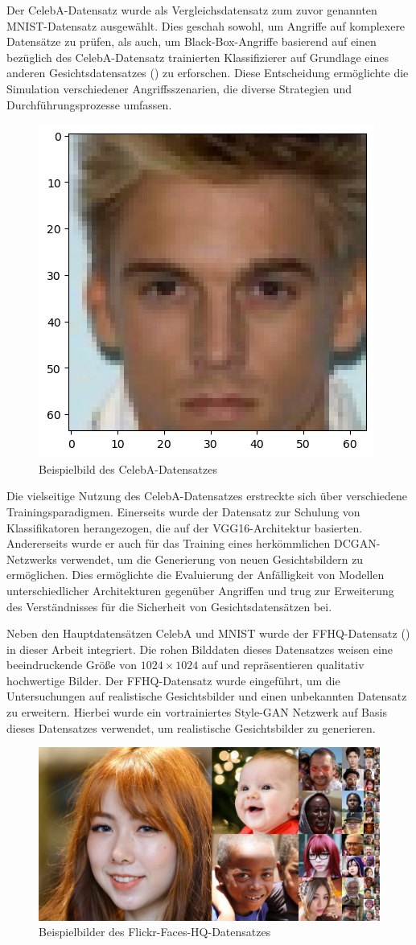 Der CelebA-Datensatz wurde als Vergleichsdatensatz zum zuvor genannten MNIST-Datensatz ausgewählt. Dies geschah sowohl, um Angriffe auf komplexere Datensätze zu prüfen, als auch, um Black-Box-Angriffe basierend auf einen bezüglich des CelebA-Datensatz trainierten Klassifizierer auf Grundlage eines anderen Gesichtsdatensatzes (\cite{noauthor_nvlabsffhq-dataset_2023}) zu erforschen. Diese Entscheidung ermöglichte die Simulation verschiedener Angriffsszenarien, die diverse Strategien und Durchführungsprozesse umfassen.

\begin{figure}[H]
	\centering
	\includegraphics[width=0.3\linewidth]{Bilder/0_celeba_one.png}
	\caption{Beispielbild des CelebA-Datensatzes}
	\label{img:celeba}
\end{figure}

Die vielseitige Nutzung des CelebA-Datensatzes erstreckte sich über verschiedene Trainingsparadigmen. Einerseits wurde der Datensatz zur Schulung von Klassifikatoren herangezogen, die auf der VGG16-Architektur basierten. Andererseits wurde er auch für das Training eines herkömmlichen DCGAN-Netzwerks verwendet, um die Generierung von \glqq neuen\grqq{} Gesichtsbildern zu ermöglichen. Dies ermöglichte die Evaluierung der Anfälligkeit von Modellen unterschiedlicher Architekturen gegenüber Angriffen und trug zur Erweiterung des Verständnisses für die Sicherheit von Gesichtsdatensätzen bei.

Neben den Hauptdatensätzen CelebA und MNIST wurde der FFHQ-Datensatz (\cite{noauthor_nvlabsffhq-dataset_2023}) in dieser Arbeit integriert. Die \glqq rohen\grqq{} Bilddaten dieses Datensatzes weisen eine beeindruckende Größe von $1024 \times 1024$ auf und repräsentieren qualitativ hochwertige Bilder. Der FFHQ-Datensatz wurde eingeführt, um die Untersuchungen auf realistische Gesichtsbilder und einen unbekannten Datensatz zu erweitern. Hierbei wurde ein vortrainiertes Style-GAN Netzwerk auf Basis dieses Datensatzes verwendet, um realistische Gesichtsbilder zu generieren.

\begin{figure}[H]
	\centering
	\includegraphics[width=0.7\linewidth]{Bilder/ffhq.png}
	\caption{Beispielbilder des Flickr-Faces-HQ-Datensatzes}
	\label{img:ffhq}
\end{figure}

